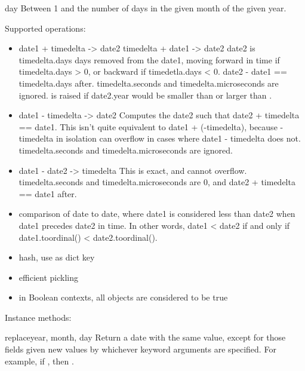 \begin{memberdesc}{day}
  Between 1 and the number of days in the given month of the given
  year.
\end{memberdesc}

Supported operations:

\begin{itemize}
  \item
    date1 + timedelta -> date2
    timedelta + date1 -> date2
    date2 is timedelta.days days removed from the date1, moving forward
    in time if timedelta.days > 0, or backward if timedetla.days < 0.
    date2 - date1 == timedelta.days after.  timedelta.seconds and
    timedelta.microseconds are ignored.   is
    raised if date2.year would be smaller than  or
    larger than .

  \item
    date1 - timedelta -> date2
    Computes the date2 such that date2 + timedelta == date1.  This
    isn't quite equivalent to date1 + (-timedelta), because -timedelta
    in isolation can overflow in cases where date1 - timedelta does
    not.  timedelta.seconds and timedelta.microseconds are ignored.

  \item
    date1 - date2 -> timedelta
    This is exact, and cannot overflow.  timedelta.seconds and
    timedelta.microseconds are 0, and date2 + timedelta == date1
    after.

  \item
    comparison of date to date, where date1 is considered less than
    date2 when date1 precedes date2 in time.  In other words,
    date1 < date2 if and only if date1.toordinal() < date2.toordinal().

  \item
    hash, use as dict key

  \item
    efficient pickling

  \item
    in Boolean contexts, all  objects are considered to be true
\end{itemize}

Instance methods:

\begin{methoddesc}{replace}{year, month, day}
  Return a date with the same value, except for those fields given
  new values by whichever keyword arguments are specified.  For
  example, if , then
  .
\end{methoddesc}

